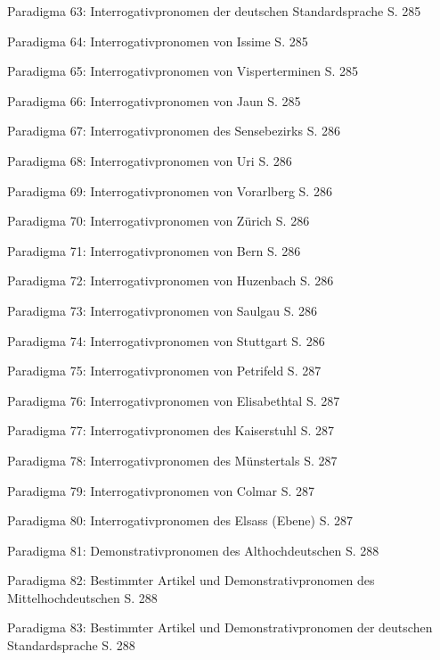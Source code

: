 Paradigma 63: Interrogativpronomen der deutschen Standardsprache \citep[169–177]{Eisenberg2006}  S. 285

Paradigma 64: Interrogativpronomen von Issime \citep[258–259, 306]{Zürrer1999}  S. 285

Paradigma 65: Interrogativpronomen von Visperterminen \citep[143]{Wipf1911}  S. 285

Paradigma 66: Interrogativpronomen von Jaun \citep[285–286]{Stucki1917}  S. 285

Paradigma 67: Interrogativpronomen des Sensebezirks \citep[201–202]{Henzen1927}  S. 286

Paradigma 68: Interrogativpronomen von Uri \citep[196]{Clauß1929}  S. 286

Paradigma 69: Interrogativpronomen von Vorarlberg \citep[282]{Jutz1925}  S. 286

Paradigma 70: Interrogativpronomen von Zürich \citep[144–145]{Weber1987}  S. 286

Paradigma 71: Interrogativpronomen von Bern \citep[106]{Marti1985}  S. 286

Paradigma 72: Interrogativpronomen von Huzenbach \citep[105]{Baur1967}  S. 286

Paradigma 73: Interrogativpronomen von Saulgau \citep[120]{Raichle1932}  S. 286

Paradigma 74: Interrogativpronomen von Stuttgart \citep[162]{Frey1975}  S. 286

Paradigma 75: Interrogativpronomen von Petrifeld \citep[66–67]{Moser1937}  S. 287

Paradigma 76: Interrogativpronomen von Elisabethtal \citep[53]{Žirmunskij1928/29}  S. 287

Paradigma 77: Interrogativpronomen des Kaiserstuhl \citep[385]{Noth1993}  S. 287

Paradigma 78: Interrogativpronomen des Münstertals \citep[48]{Mankel1886}  S. 287

Paradigma 79: Interrogativpronomen von Colmar \citep[85–86]{Henry1900}  S. 287

Paradigma 80: Interrogativpronomen des Elsass (Ebene) \citep[164–167]{Beyer1963}  S. 287

Paradigma 81: Demonstrativpronomen des Althochdeutschen \citep[247–249]{Braune2004}  S. 288

Paradigma 82: Bestimmter Artikel und Demonstrativpronomen des Mittelhochdeutschen \citep[217–219]{Paul2007}  S. 288

Paradigma 83: Bestimmter Artikel und Demonstrativpronomen der deutschen Standardsprache \citep[169–177]{Eisenberg2006}  S. 288


